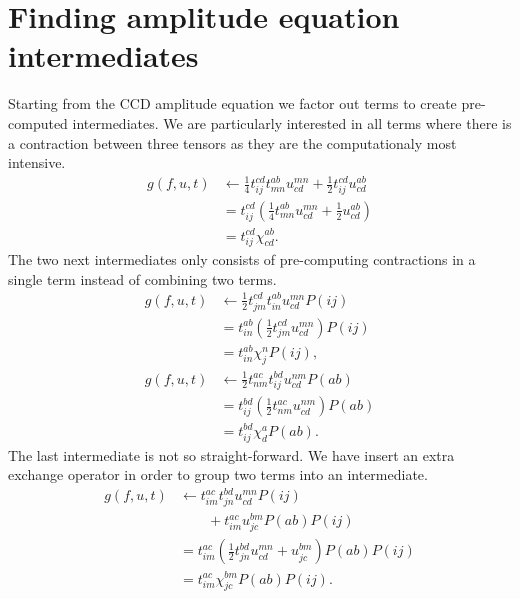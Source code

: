 \documentclass[
    a4paper, aps, twocolumn, floatfix, superscriptaddress,
    nofootinbib]{revtex4-1}
\newcommand{\1}{\mathds{1}}
\newcommand{\para}[1]{\left(#1\right)}
\begin{document}
\section{Finding amplitude equation intermediates}
    \label{app:intermediates}
    Starting from the CCD amplitude equation we factor out terms to create
    pre-computed intermediates. We are particularly interested in all terms
    where there is a contraction between three tensors as they are the
    computationaly most intensive.
    \begin{align}
        g(f, u, t) &\gets
        \frac{1}{4}t^{cd}_{ij} t^{ab}_{mn} u^{mn}_{cd}
        + \frac{1}{2}t^{cd}_{ij} u^{ab}_{cd}
        \\
        &= t^{cd}_{ij} \para{
            \frac{1}{4}t^{ab}_{mn} u^{mn}_{cd} + \frac{1}{2} u^{ab}_{cd}
        } \\
        &= t^{cd}_{ij}\chi^{ab}_{cd}.
    \end{align}
    The two next intermediates only consists of pre-computing contractions in a
    single term instead of combining two terms.
    \begin{align}
        g(f, u, t) &\gets
        \frac{1}{2}t^{cd}_{jm} t^{ab}_{in} u^{mn}_{cd} P(ij)
        \\
        &= t^{ab}_{in} \left(\frac{1}{2} t^{cd}_{jm} u^{mn}_{cd}\right) P(ij)
        \\
        &= t^{ab}_{in}\chi^n_j P(ij),
        \\
        g(f, u, t) &\gets
        \frac{1}{2}t^{ac}_{nm} t^{bd}_{ij} u^{nm}_{cd} P(ab)
        \\
        &=
        t^{bd}_{ij} \left(\frac{1}{2}t^{ac}_{nm}  u^{nm}_{cd}\right) P(ab)
        \\
        &= t^{bd}_{ij}\chi^a_d P(ab).
    \end{align}
    The last intermediate is not so straight-forward. We have insert an extra
    exchange operator in order to group two terms into an intermediate.
    \begin{align}
        g(f, u, t) &\gets
        t^{ac}_{im} t^{bd}_{jn} u^{mn}_{cd} P(ij)
        \nonumber \\
        &\qquad
        + t^{ac}_{im} u^{bm}_{jc} P(ab) P(ij) \\
        &=
        t^{ac}_{im}\left(\frac{1}{2} t^{bd}_{jn} u^{mn}_{cd}
        + u^{bm}_{jc} \right)P(ab) P(ij) \\
        &=
        t^{ac}_{im}\chi^{bm}_{jc} P(ab)P(ij).
    \end{align}
\end{document}
